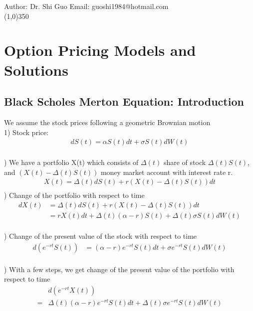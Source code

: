 \documentclass[a4paper]{article}
\begin{document}
Author: Dr. Shi Guo  \hspace{30mm} Email: guoshi1984@hotmail.com\\
\line(1,0){350}
\section{Option Pricing Models and Solutions}
\subsection{Black Scholes Merton Equation: Introduction}
We assume the stock prices following a geometric Brownian motion\\
1) Stock price:\\
\begin{align*}
	 dS(t) = \alpha S(t) dt + \sigma S(t) dW(t)\\
\end{align*}
 
) We have a portfolio X(t) which consists of $\Delta(t)$ share of stock  $\Delta(t) S(t)$, and $(X(t) - \Delta (t) S(t))$ money market account with interest rate r. \\  
\begin{align*}
	X(t) = \Delta(t) dS(t) + r(X(t) -\Delta(t) S(t)) dt\\
\end{align*}
) Change of the portfolio with respect to time
\begin{align*}
	  d X(t) & = \Delta(t) d S(t) + r(X(t) - \Delta(t) S(t)) dt \\
             & = r X(t) dt + \Delta(t) (\alpha - r )S(t) + \Delta (t) \sigma S(t) d W(t) \\
\end{align*}
                      
) Change of the present value of the stock with respect to time\\
\begin{align*}
	d(e^{-r t} S(t)) & = (\alpha - r) e^{- r t}S(t) dt + \sigma e^{- r t} S(t) dW(t) \\
\end{align*}

) With a few steps, we get change of the present value of the portfolio with respect to time\\
\begin{align*}
 & d(e^{- r t} X(t)) \\
 = & \Delta(t) (\alpha - r) e^{-rt} S(t) dt + \Delta(t) \sigma e^{-rt} S(t) dW(t)\\
\end{align*}
\end{document}
